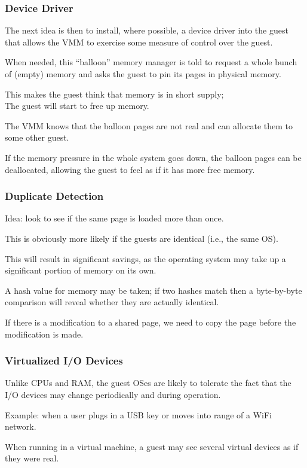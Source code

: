 \begin{frame}
\frametitle{Device Driver}

The next idea is then to install, where possible, a device driver into the guest that allows the VMM to exercise some measure of control over the guest. 

When needed, this ``balloon'' memory manager is told to request a whole bunch of (empty) memory and asks the guest to pin its pages in physical memory. 

This makes the guest think that memory is in short supply;\\
\quad The guest will start to free up memory. 

The VMM knows that the balloon pages are not real and can allocate them to some other guest. 

If the memory pressure in the whole system goes down, the balloon pages can be deallocated, allowing the guest to feel as if it has more free memory.

\end{frame}



\begin{frame}
\frametitle{Duplicate Detection}

Idea: look to see if the same page is loaded more than once. 

This is obviously more likely if the guests are identical (i.e., the same OS). 

This will result in significant savings, as the operating system may take up a significant portion of memory on its own. 

A hash value for memory may be taken; if two hashes match then a byte-by-byte comparison will reveal whether they are actually identical. 

If there is a modification to a shared page, we need to copy the page before the modification is made.


\end{frame}

\begin{frame}
\frametitle{Virtualized I/O Devices}

Unlike CPUs and RAM, the guest OSes are likely to tolerate the fact that the I/O devices may change periodically and during operation.

Example: when a user plugs in a USB key or moves into range of a WiFi network. 

When running in a virtual machine, a guest may see several virtual devices as if they were real.


\end{frame}

